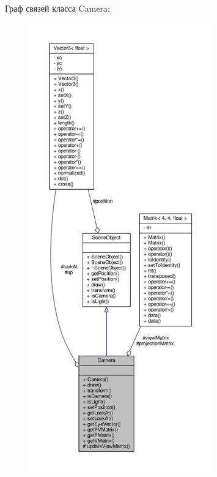 Граф связей класса Camera\+:
\nopagebreak
\begin{figure}[H]
\begin{center}
\leavevmode
\includegraphics[height=550pt]{d0/dcb/class_camera__coll__graph}
\end{center}
\end{figure}
